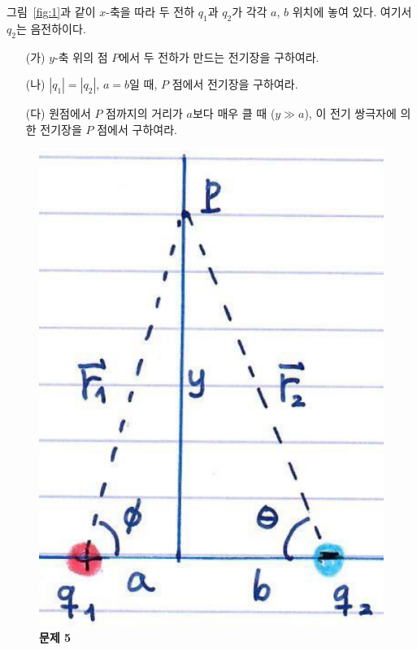 \documentclass[tightenlines,floatfix,nofootinbib,superscriptaddress,fleqn]{revtex4}
\begin{document}
그림~\ref{fig:1}과 같이 $x$-축을 따라 두 전하 $q_1$과 $q_2$가 각각
$a$, $b$ 위치에 놓여 있다. 여기서 $q_2$는 음전하이다. 
\begin{itemize}
\item[(가)] $y$-축 위의 점 $P$에서 두 전하가 만드는 전기장을
  구하여라. 
\item[(나)] $|q_1|=|q_2|$, $a=b$일 때, $P$ 점에서 전기장을 구하여라. 
\item[(다)] 원점에서 $P$ 점까지의 거리가 $a$보다 매우 클 때 ($y\gg
  a$), 이 전기 쌍극자에 의한 전기장을 $P$ 점에서 구하여라. 
\end{itemize}
\begin{figure}[htp]
  \centering
  \includegraphics[scale=0.4]{Qfig20220829-1.pdf}
  \caption{\textbf{문제 5}}
  \label{fig:3}
\end{figure}
\vspace{1.cm}
\end{document}

